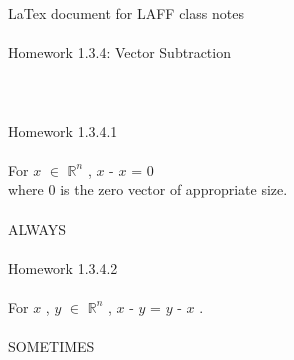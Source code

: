 \documentclass[11pt]{article}
\begin{document}
LaTex document for LAFF class notes
\\
\\
Homework 1.3.4: Vector Subtraction
\\
\\
\\
\\
Homework 1.3.4.1
\\
\\
For
$x$
$\in$
$\mathbb{R}^n$
,
$x$
-
$x$
= 0
\\
where 0 is the zero vector of appropriate size.
\\
\\
ALWAYS
\\
\\
Homework 1.3.4.2
\\
\\
For
$x$
,
$y$
$\in$
$\mathbb{R}^n$
,
$x$
-
$y$
=
$y$
-
$x$
.
\\
\\
SOMETIMES
\end{document}
